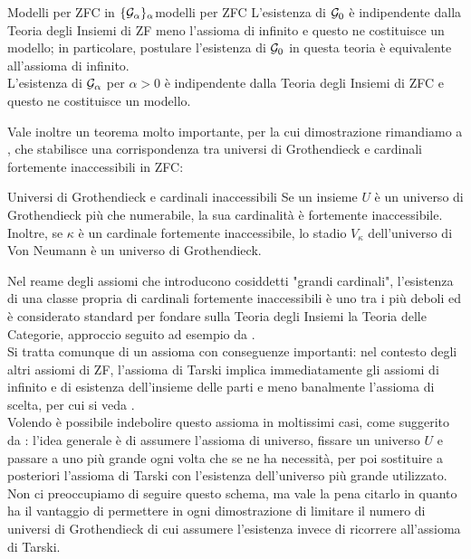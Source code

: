 \documentclass[openany]{book}
\begin{document}
\begin{theorem}{Modelli per ZFC in $\{\mathcal{G}_\alpha\}_{\alpha}$}{modelli per ZFC}
    L'esistenza di $\mathcal{G}_0$ è indipendente dalla Teoria degli Insiemi di ZF meno l'assioma di infinito e questo ne costituisce un modello; in particolare, postulare l'esistenza di $\mathcal{G}_0$ in questa teoria è equivalente all'assioma di infinito.\\
    L'esistenza di $\mathcal{G}_\alpha$ per $\alpha>0$ è indipendente dalla Teoria degli Insiemi di ZFC e questo ne costituisce un modello.
\end{theorem}

Vale inoltre un teorema molto importante, per la cui dimostrazione rimandiamo a \cite{Williams1969}, che stabilisce una corrispondenza tra universi di Grothendieck e cardinali fortemente inaccessibili in ZFC:

\begin{theorem}{Universi di Grothendieck e cardinali inaccessibili}{}
    Se un insieme $U$ è un universo di Grothendieck più che numerabile, la sua cardinalità è fortemente inaccessibile.\\
    Inoltre, se $\kappa$ è un cardinale fortemente inaccessibile, lo stadio $V_\kappa$ dell'universo di Von Neumann è un universo di Grothendieck.
\end{theorem}

Nel reame degli assiomi che introducono cosiddetti "grandi cardinali", l'esistenza di una classe propria di cardinali fortemente inaccessibili è uno tra i più deboli ed è considerato standard per fondare sulla Teoria degli Insiemi la Teoria delle Categorie, approccio seguito ad esempio da \cite{SGA4}.\\
Si tratta comunque di un assioma con conseguenze importanti: nel contesto degli altri assiomi di ZF, l'assioma di Tarski implica immediatamente gli assiomi di infinito e di esistenza dell'insieme delle parti e meno banalmente l'assioma di scelta, per cui si veda \cite{Tarski1939}.\\
Volendo è possibile indebolire questo assioma in moltissimi casi, come suggerito da \cite{MacLane1978}: l'idea generale è di assumere l'assioma di universo, fissare un universo $U$ e passare a uno più grande ogni volta che se ne ha necessità, per poi sostituire a posteriori l'assioma di Tarski con l'esistenza dell'universo più grande utilizzato. Non ci preoccupiamo di seguire questo schema, ma vale la pena citarlo in quanto ha il vantaggio di permettere in ogni dimostrazione di limitare il numero di universi di Grothendieck di cui assumere l'esistenza invece di ricorrere all'assioma di Tarski.
\end{document}
